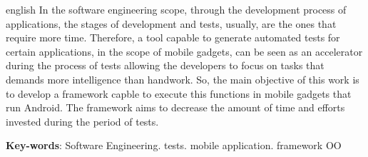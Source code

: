 \documentclass[
  12pt,       %
  openright,      %
  twoside,      %
  a4paper,      %
  english,      %
  french,       %
  spanish,      %
  brazil,       %
  ]{abntex2}
\begin{document}
\begin{resumo}[Abstract]
 \begin{otherlanguage*}{english}
   In the software engineering scope, through the development process of
   applications, the stages of development and tests, usually, are the
   ones that require more time. Therefore, a tool capable to generate
   automated tests for certain applications, in the scope of mobile
   gadgets, can be seen as an accelerator during the process of
   tests allowing the developers to focus on tasks that demands
   more intelligence than handwork. So, the main objective of this work
   is to develop a framework capble to execute this functions in mobile
   gadgets that run Android. The framework aims to decrease the amount of
   time and efforts invested during the period of tests.

   \vspace{\onelineskip}

   \noindent
   \textbf{Key-words}: Software Engineering. tests. mobile application. framework OO
 \end{otherlanguage*}
\end{resumo}

\listoffigures*
\cleardoublepage

\listoftables*
\cleardoublepage

\begin{siglas}
\end{siglas}

\tableofcontents*
\cleardoublepage



\textual

\end{document}
